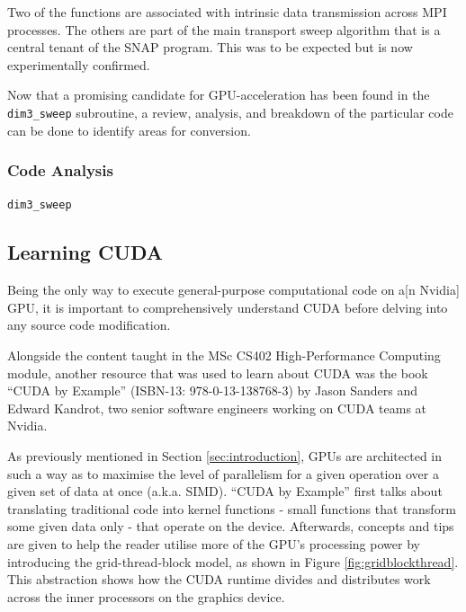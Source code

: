 \documentclass[conference]{IEEEtran}
\begin{document}
Two of the functions are associated with intrinsic data transmission across MPI processes. The others are part of the main transport sweep algorithm that is a central tenant of the SNAP program. This was to be expected but is now experimentally confirmed.

Now that a promising candidate for GPU-acceleration has been found in the \texttt{dim3\_sweep} subroutine, a review, analysis, and breakdown of the particular code can be done to identify areas for conversion.


\subsubsection{Code Analysis}
\label{subsec:inv_codeanalysis}

\texttt{dim3\_sweep}

\subsection{Learning CUDA}
\label{subsec:inv_learningcuda}

Being the only way to execute general-purpose computational code on a[n Nvidia] GPU, it is important to comprehensively understand CUDA before delving into any source code modification.

Alongside the content taught in the MSc CS402 High-Performance Computing module, another resource that was used to learn about CUDA was the book ``CUDA by Example'' (ISBN-13: 978-0-13-138768-3) by Jason Sanders and Edward Kandrot\cite{sanders2010cuda}, two senior software engineers working on CUDA teams at Nvidia.

As previously mentioned in Section \ref{sec:introduction}, GPUs are architected in such a way as to maximise the level of parallelism for a given operation over a given set of data at once (a.k.a. SIMD). ``CUDA by Example'' first talks about translating traditional code into kernel functions - small functions that transform some given data only - that operate on the device. Afterwards, concepts and tips are given to help the reader utilise more of the GPU's processing power by introducing the grid-thread-block model, as shown in Figure \ref{fig:gridblockthread}. This abstraction shows how the CUDA runtime divides and distributes work across the inner processors on the graphics device.
\end{document}
